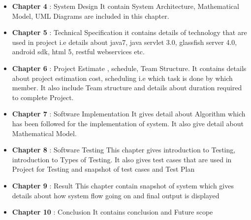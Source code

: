 \begin{itemize}
  \item \textbf{Chapter 4} : System Design It contain System Architecture, Mathematical Model, UML Diagrams are included in this chapter.
\end{itemize}

\begin{itemize}
  \item \textbf{Chapter 5} : Technical Specification it contains details of technology that are used in project i.e details about java7, java servlet 3.0, glassfish server 4.0, android sdk, html 5, restful webservices etc.
\end{itemize}

\begin{itemize}
  \item \textbf{Chapter 6} : Project Estimate , schedule, Team Structure. It contains details about project estimation cost, scheduling i.e which task is done by which member. It also include Team structure and details about duration required to complete Project.
\end{itemize}

\begin{itemize}
  \item \textbf{Chapter 7} : Software Implementation It gives detail about Algorithm which has been followed for the implementation of system. It also give detail about Mathematical Model.
\end{itemize}

\begin{itemize}
  \item \textbf{Chapter 8} : Software Testing This chapter gives introduction to Testing, introduction to Types of Testing. It also gives test cases that are used in Project for Testing and snapshot of test cases and Test Plan
\end{itemize}

\begin{itemize}
  \item \textbf{Chapter 9} : Result This chapter contain snapshot of system which gives details about how system flow going on and final output is displayed
\end{itemize}



\begin{itemize}
  \item \textbf{Chapter 10} : Conclusion It contains conclusion and Future scope
\end{itemize}
